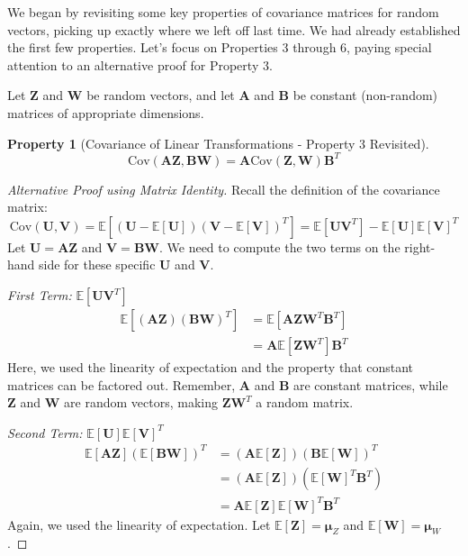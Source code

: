 \documentclass[11pt, letterpaper]{article}
\newtheorem{property}[theorem]{Property}
\theoremstyle{definition}
\newcommand{\E}{\mathbb{E}}
\newcommand{\Cov}{\text{Cov}}
\newcommand{\mat}[1]{\mathbf{#1}} %
\newcommand{\vect}[1]{\boldsymbol{#1}} %
\newcommand{\T}{^T} %
\begin{document}
We began by revisiting some key properties of covariance matrices for random vectors, picking up exactly where we left off last time. We had already established the first few properties. Let's focus on Properties 3 through 6, paying special attention to an alternative proof for Property 3.

Let $\vect{Z}$ and $\vect{W}$ be random vectors, and let $\mat{A}$ and $\mat{B}$ be constant (non-random) matrices of appropriate dimensions.

\begin{property}[Covariance of Linear Transformations - Property 3 Revisited]
\[
\Cov(\mat{A}\vect{Z}, \mat{B}\vect{W}) = \mat{A} \Cov(\vect{Z}, \vect{W}) \mat{B}\T
\]
\end{property}

\begin{proof}[Alternative Proof using Matrix Identity]
Recall the definition of the covariance matrix:
\[
\Cov(\vect{U}, \vect{V}) = \E[(\vect{U} - \E[\vect{U}])(\vect{V} - \E[\vect{V}])\T] = \E[\vect{U}\vect{V}\T] - \E[\vect{U}]\E[\vect{V}]\T
\]
Let $\vect{U} = \mat{A}\vect{Z}$ and $\vect{V} = \mat{B}\vect{W}$. We need to compute the two terms on the right-hand side for these specific $\vect{U}$ and $\vect{V}$.

\textit{First Term:} $\E[\vect{U}\vect{V}\T]$
\begin{align*}
\E[(\mat{A}\vect{Z})(\mat{B}\vect{W})\T] &= \E[\mat{A}\vect{Z}\vect{W}\T\mat{B}\T] \\
&= \mat{A} \E[\vect{Z}\vect{W}\T] \mat{B}\T
\end{align*}
Here, we used the linearity of expectation and the property that constant matrices can be factored out. Remember, $\mat{A}$ and $\mat{B}$ are constant matrices, while $\vect{Z}$ and $\vect{W}$ are random vectors, making $\vect{Z}\vect{W}\T$ a random matrix.

\textit{Second Term:} $\E[\vect{U}]\E[\vect{V}]\T$
\begin{align*}
\E[\mat{A}\vect{Z}] (\E[\mat{B}\vect{W}])\T &= (\mat{A}\E[\vect{Z}]) (\mat{B}\E[\vect{W}])\T \\
&= (\mat{A}\E[\vect{Z}]) (\E[\vect{W}]\T \mat{B}\T) \\
&= \mat{A} \E[\vect{Z}] \E[\vect{W}]\T \mat{B}\T
\end{align*}
Again, we used the linearity of expectation. Let $\E[\vect{Z}] = \vect{\mu}_Z$ and $\E[\vect{W}] = \vect{\mu}_W$.


\end{proof}
\end{document}
